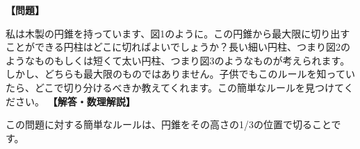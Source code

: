 \documentclass[10pt,a4paper,oneside,openany]{ltjsbook}
\begin{document}
\begin{tcolorbox}[colback=softblue,colframe=primaryblue,title=\textbf{第 202 問：円錐のパズル （原題: THE CONE PUZZLE.）},arc=2mm,boxrule=1pt,breakable]
\textbf{【問題】}\par\vspace{0.3em}
私は木製の円錐を持っています、図1のように。この円錐から最大限に切り出すことができる円柱はどこに切ればよいでしょうか？長い細い円柱、つまり図2のようなものもしくは短くて太い円柱、つまり図3のようなものが考えられます。しかし、どちらも最大限のものではありません。子供でもこのルールを知っていたら、どこで切り分けるべきか教えてくれます。この簡単なルールを見つけてください。
\tcblower
\textbf{【解答・数理解説】}\par\vspace{0.3em}
この問題に対する簡単なルールは、円錐をその高さの1/3の位置で切ることです。
\end{tcolorbox}
\end{document}
